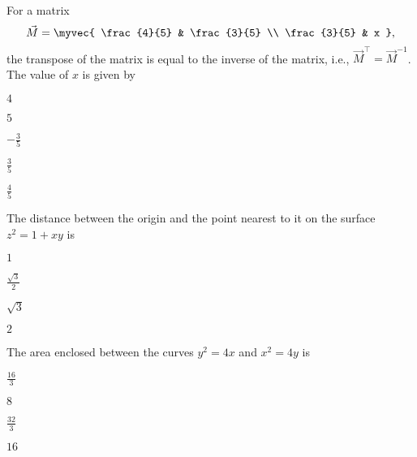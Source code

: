 \item For a matrix $$\vec{M}=\myvec{ \frac{4}{5} & \frac{3}{5} \\ \frac{3}{5} & x },$$ the transpose of the matrix is equal to the inverse of the matrix, i.e., $\vec{M}^{\top}=\vec{M}^{-1}$. The value of $x$ is given by
  \hfill{}
  \begin{enumerate}
    \begin{multicols}{5}
        \item $4$
        \item $5$
        \item $-\frac{3}{5}$
        \item $\frac{3}{5}$
        \item $\frac{4}{5}$
    \end{multicols}
  \end{enumerate}

\item The distance between the origin and the point nearest to it on the surface $z^2 = 1+xy$ is
\hfill{}
\begin{enumerate}
  \begin{multicols}{4}
  \item $1$
  \item $\frac{\sqrt{3}}{2}$
  \item $\sqrt{3}$
  \item $2$
  \end{multicols}
\end{enumerate}

\item The area enclosed between the curves $y^2 = 4x$ and $x^2 = 4y$ is
\hfill{}
\begin{enumerate}
  \begin{multicols}{4}
  \item $\frac{16}{3}$
  \item $8$
  \item $\frac{32}{3}$
  \item $16$
  \end{multicols}
\end{enumerate}

